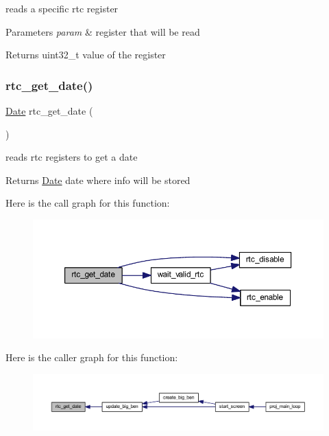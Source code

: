 reads a specific rtc register 


\begin{DoxyParams}{Parameters}
{\em param} & register that will be read \\
\hline
\end{DoxyParams}
\begin{DoxyReturn}{Returns}
uint32\+\_\+t value of the register 
\end{DoxyReturn}
\mbox{\label{group__rtc_ga4b3527c6c15373fa4ccbf8c43557531d}} 
\subsubsection{\texorpdfstring{rtc\+\_\+get\+\_\+date()}{rtc\_get\_date()}}
{\footnotesize\ttfamily \mbox{\hyperlink{struct_date}{Date}} rtc\+\_\+get\+\_\+date (\begin{DoxyParamCaption}{ }\end{DoxyParamCaption})}



reads rtc registers to get a date 

\begin{DoxyReturn}{Returns}
\mbox{\hyperlink{struct_date}{Date}} date where info will be stored 
\end{DoxyReturn}
Here is the call graph for this function\+:
\nopagebreak
\begin{figure}[H]
\begin{center}
\leavevmode
\includegraphics[width=350pt]{group__rtc_ga4b3527c6c15373fa4ccbf8c43557531d_cgraph}
\end{center}
\end{figure}
Here is the caller graph for this function\+:\nopagebreak
\begin{figure}[H]
\begin{center}
\leavevmode
\includegraphics[width=350pt]{group__rtc_ga4b3527c6c15373fa4ccbf8c43557531d_icgraph}
\end{center}
\end{figure}
\mbox{\label{group__rtc_gafd5a541a5a16634152431be542dc9565}} 
